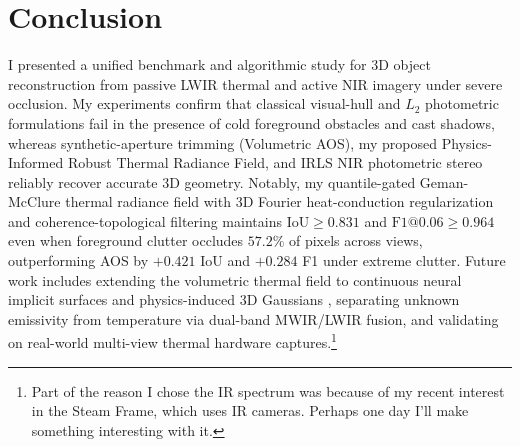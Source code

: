 \documentclass[12pt,letterpaper]{article}
\begin{document}
\section{Conclusion}
\label{sec:conclusion}

I presented a unified benchmark and algorithmic study for 3D object reconstruction from passive LWIR thermal and active NIR imagery under severe occlusion. My experiments confirm that classical visual-hull and $L_2$ photometric formulations fail in the presence of cold foreground obstacles and cast shadows, whereas synthetic-aperture trimming (Volumetric AOS), my proposed Physics-Informed Robust Thermal Radiance Field, and IRLS NIR photometric stereo reliably recover accurate 3D geometry. Notably, my quantile-gated Geman-McClure thermal radiance field with 3D Fourier heat-conduction regularization and coherence-topological filtering maintains $\text{IoU} \ge 0.831$ and $\text{F1@0.06} \ge 0.964$ even when foreground clutter occludes $57.2\%$ of pixels across views, outperforming AOS by $+0.421$ IoU and $+0.284$ F1 under extreme clutter. Future work includes extending the volumetric thermal field to continuous neural implicit surfaces \cite{wang2021neus} and physics-induced 3D Gaussians \cite{chen2024thermal3dgs}, separating unknown emissivity from temperature via dual-band MWIR/LWIR fusion, and validating on real-world multi-view thermal hardware captures.\footnote{Part of the reason I chose the IR spectrum was because of my recent interest in the Steam Frame, which uses IR cameras. Perhaps one day I'll make something interesting with it.}



\end{document}
